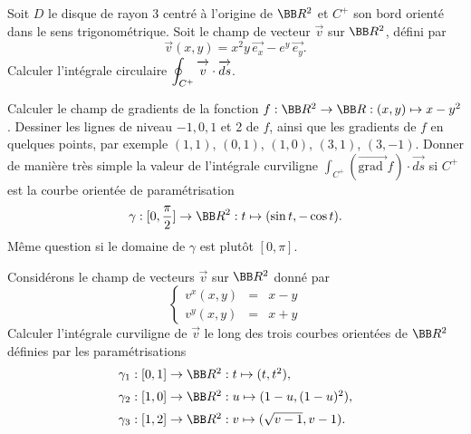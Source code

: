 \documentclass[12pt,french,oneside,a4paper]{memoir} %
\begin{document}
\begin{exo}
Soit $D$ le disque de rayon 3 centré à l'origine de $\BB
R^2$ et $C^+$ son bord orienté dans le sens trigonométrique.
Soit le champ de vecteur $\overrightarrow
v$ sur $\BB R^2$, défini par
\begin{equation*}
 \overrightarrow v(x,y)=x^2y\,\overrightarrow{e_x}-e^y\,
\overrightarrow{e_y}.
\end{equation*}
Calculer l'intégrale circulaire $\displaystyle{\oint_{C^+}
 \overrightarrow{\mathstrut
v}\cdot\overrightarrow{\mathstrut{ds}}}$.
\end{exo}
\begin{exo}
Calculer le champ de gradients de la fonction $f:\BB R^2\rightarrow \BB R:(x,y)\mapsto
x-y^2$. Dessiner les lignes de niveau $-1, 0, 1$ et 2 de $f$, ainsi
que les gradients de $f$ en quelques points, par exemple $(1,1)$,
$(0,1)$, $(1,0)$, $(3,1)$, $(3,-1)$. Donner de manière très
simple la valeur de l'intégrale curviligne
$\displaystyle{\int_{C^+}(\overrightarrow{\mbox{grad }}f)
\cdot\overrightarrow{ds}}$
si $C^+$ est la courbe orientée de paramétrisation
\begin{equation*}
\gamma:[0,\frac{\pi}{2}]\rightarrow\BB R^2:t\mapsto(\sin t,-\cos t).
\end{equation*} 
Même question si le domaine de
$\gamma$ est plutôt $[0,\pi]$.
\end{exo}
\begin{exo}
Considérons le champ de vecteurs $\overrightarrow v$ sur $\BB
R^2$ donné par
\begin{equation*}
\left\{
\begin{array}{lll}
v^x(x,y)&=&x-y\\[2mm]
v^y(x,y)&=&x+y
\end{array}
\right.
\end{equation*}
Calculer l'intégrale curviligne de $\overrightarrow v$ le long
des trois courbes orientées de $\BB R^2$ définies par les
paramétrisations
\begin{equation*}
\begin{array}{l}
\gamma_1:[0,1]\rightarrow\BB R^2:t\mapsto(t,t^2),\\[2mm]
\gamma_2:[1,0]\rightarrow\BB R^2:u\mapsto(1-u,(1-u)^2),\\[2mm]
\gamma_3:[1,2]\rightarrow\BB R^2:v\mapsto(\sqrt{v-1},v-1).
\end{array}
\end{equation*}
\end{exo}
\end{document}
